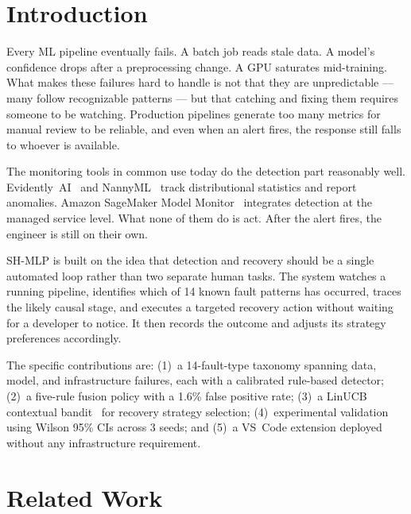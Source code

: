 \documentclass[conference]{IEEEtran}
\begin{document}
\section{Introduction}

Every ML pipeline eventually fails. A batch job reads stale data. A model's
confidence drops after a preprocessing change. A GPU saturates mid-training.
What makes these failures hard to handle is not that they are unpredictable
--- many follow recognizable patterns --- but that catching and fixing them
requires someone to be watching. Production pipelines generate too many
metrics for manual review to be reliable, and even when an alert fires, the
response still falls to whoever is available.

The monitoring tools in common use today do the detection part reasonably well.
Evidently~AI~\cite{evidently} and NannyML~\cite{nannynml} track distributional
statistics and report anomalies. Amazon SageMaker Model Monitor~\cite{sagemaker}
integrates detection at the managed service level. What none of them do is act.
After the alert fires, the engineer is still on their own.

SH-MLP is built on the idea that detection and recovery should be a single
automated loop rather than two separate human tasks. The system watches a
running pipeline, identifies which of 14 known fault patterns has occurred,
traces the likely causal stage, and executes a targeted recovery action
without waiting for a developer to notice. It then records the outcome and
adjusts its strategy preferences accordingly.

The specific contributions are: (1)~a 14-fault-type taxonomy spanning data,
model, and infrastructure failures, each with a calibrated rule-based
detector; (2)~a five-rule fusion policy with a 1.6\% false positive rate;
(3)~a LinUCB contextual bandit~\cite{linucb} for recovery strategy selection;
(4)~experimental validation using Wilson 95\% CIs across 3 seeds; and
(5)~a VS~Code extension deployed without any infrastructure requirement.

\section{Related Work}
\end{document}
